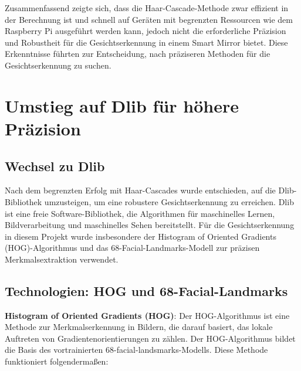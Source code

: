 \noindent Zusammenfassend zeigte sich, dass die Haar-Cascade-Methode zwar effizient in der Berechnung ist und schnell auf Geräten mit begrenzten Ressourcen wie dem Raspberry Pi ausgeführt werden kann, jedoch nicht die erforderliche Präzision und Robustheit für die Gesichtserkennung in einem Smart Mirror bietet. Diese Erkenntnisse führten zur Entscheidung, nach präziseren Methoden für die Gesichtserkennung zu suchen.




\section{Umstieg auf Dlib für höhere Präzision}

\subsection{Wechsel zu Dlib}
Nach dem begrenzten Erfolg mit Haar-Cascades wurde entschieden, auf die Dlib-Bibliothek umzusteigen, um eine robustere Gesichtserkennung zu erreichen. Dlib ist eine freie Software-Bibliothek, die Algorithmen für maschinelles Lernen, Bildverarbeitung und maschinelles Sehen bereitstellt. Für die Gesichtserkennung in diesem Projekt wurde insbesondere der Histogram of Oriented Gradients (HOG)-Algorithmus und das 68-Facial-Landmarks-Modell zur präzisen Merkmalsextraktion verwendet.

\subsection{Technologien: HOG und 68-Facial-Landmarks}
\textbf{Histogram of Oriented Gradients (HOG)}: Der HOG-Algorithmus ist eine Methode zur Merkmalserkennung in Bildern, die darauf basiert, das lokale Auftreten von Gradientenorientierungen zu zählen. Der HOG-Algorithmus bildet die Basis des vortrainierten 68-facial-landsmarks-Modells. Diese Methode funktioniert folgendermaßen:

